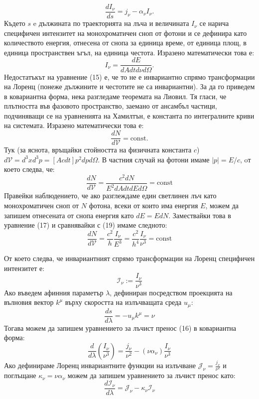 \begin{equation}
	\frac{dI_\nu}{ds} = j_\nu - \alpha_\nu I_\nu.
\end{equation}
Където $s$ e дължината по траекторията на лъча и величината $I_\nu$ се нарича специфичен интензитет на монохроматичен сноп от фотони и се дефинира като количеството енергия, отнесена от снопа за единица време, от единица площ, в единица пространствен ъгъл, на единица честота. Изразено математически това е:
\begin{equation}
	I_\nu = \frac{dE}{dAdtd\nu d\Omega}.
\end{equation}
Недостатъкът на уравнение (15) е, че то не е инвариантно спрямо трансформации на Лоренц (понеже дължините и честотите не са инвариантни). За да го приведем в ковариантна форма, нека разгледаме теоремата на Лиовил. Тя гласи, че плътността във фазовото пространство, заемано от ансамбъл частици, подчиняващи се на уравненията на Хамилтън, е константа по интегралните криви на системата. Изразено математически това е:
\begin{equation}
	\frac{dN}{d\mathcal{V}} = \text{const}.
\end{equation}
Тук (за яснота, връщайки стойността на физичната константа $c$) $d\mathcal{V} = d^3x d^3p = \left[A cdt\right] p^2dpd\Omega$. В частния случай на фотони имаме $|p| = E / c$, oт което следва, че:
\begin{equation}
	\frac{dN}{d\mathcal{V}} = \frac{c^2dN}{E^2dAdtdEd\Omega} = \text{const}
\end{equation}
Правейки наблюдението, че ако разглеждаме един светлинен лъч като монохроматичен сноп от $N$ фотона, всеки от които има енергия $E$, можем да запишем отнесената от снопа енергия като $dE = EdN$. Замествайки това в уравнение (17) и сравнявайки с (19) имаме следното:
\begin{equation}
	\frac{dN}{d\mathcal{V}} = \frac{c^2}{h}\frac{I_\nu}{E^3} = \frac{c^2}{h^4}\frac{I_\nu}{\nu^3} = \text{const}
\end{equation}

От което следва, че инвариантният спрямо трансформации на Лоренц специфичен интензитет е:
\begin{equation}
	\mathcal{I}_\nu := \frac{I_\nu}{\nu^3}
\end{equation}
Ако въведем афинния параметър $\lambda$, дефиниран посредством проекцията на вълновия вектор $k^\mu$ върху скоростта на излъчващата среда $u_\mu$:
\begin{equation}
	\frac{ds}{d\lambda} = -u_\mu k^\mu = \nu
\end{equation}
Тогава можем да запишем уравнението за лъчист пренос (16) в ковариантна форма:
\begin{equation}
	\frac{d}{d\lambda}\left(\frac{I_\nu}{\nu^3}\right) = \frac{j_\nu}{\nu^2} - (\nu\alpha_\nu)\frac{I_\nu}{\nu^3}
\end{equation}
Ако дефинираме Лоренц инвариантните функции на излъчване $\mathcal{J}_\nu = \frac{j_\nu}{\nu^2}$ и поглъщане $\kappa_\nu = \nu\alpha_\nu$ можем да запишем уравнението за лъчист пренос като:
\begin{equation}
	\frac{d\mathcal{I}_\nu}{d\lambda} = \mathcal{J}_\nu - \kappa_\nu\mathcal{I}_\nu
\end{equation}

